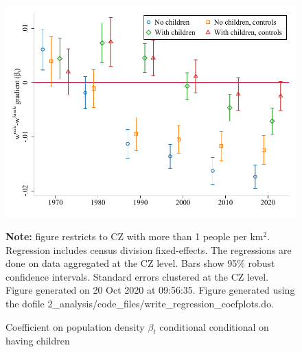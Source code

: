 \begin{figure}[!h]
\centering
\caption{Coefficient on population density $ \beta_t $ conditional conditional on having children}
\includegraphics[width=.6\textwidth]{../2_analysis/output/figures/by_children_l_czone_pop_full_time}
\par \begin{minipage}[h]{\textwidth}{\tiny\textbf{Note:} figure restricts to CZ with more than 1 people per km$^2$. Regression includes census division fixed-effects. The regressions are done on data aggregated at the CZ level. Bars show 95\% robust confidence intervals. Standard errors clustered at the CZ level. Figure generated on 20 Oct 2020 at 09:56:35. Figure generated using the dofile 2\_analysis/code\_files/write\_regression\_coefplots.do.}\end{minipage}
\end{figure}
